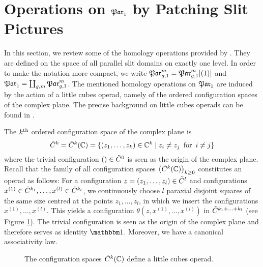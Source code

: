 \section{Operations on \texorpdfstring{$\mathfrak{Par}_1$}{Par1} by Patching Slit Pictures}
\label{homology_operations:parallel_patching_slit_pics}
In this section, we review some of the homology operations provided by \cite{Boedigheimer19902}.
They are defined on the space of all parallel slit domains on exactly one level.
\label{page:shorthand_par_1}%
In order to make the notation more compact, we write $\mathfrak{Par}^m_{g,1} = \mathfrak{Par}^m_{g,1}[(1)]$ and $\mathfrak{Par}_1 = \coprod_{g,m} \mathfrak{Par}^m_{g,1}$.
The mentioned homology operations on $\mathfrak{Par}_1$ are induced by the action of a little cubes operad, namely of the ordered configuration spaces of the complex plane.
The precise background on little cubes operads can be found in \cite{May1972}.

\label{page:configuration_space_cplx_plane}%
The $k^{\text{th}}$ ordered configuration space of the complex plane is
\[
    \cspc k = \cspc k (\C) = \{ ( z_1, \ldots, z_k) \in \C^k \mid z_i \neq z_j \mspc{for}{5} i\neq j\}
\]
where the trivial configuration $() \in {\tilde C^{0}}$ is seen as the origin of the complex plane.
\label{page:operad_theta}%
Recall that the family of all configuration spaces $\big( {\tilde C^{k}}(\mathbb C) \big)_{k \ge 0}$ constitutes an operad as follows:
For a configuration $z = (z_1, \ldots, z_l) \in \cspc l$ and configurations $x^{(1)} \in \cspc{k_1}, \ldots, x^{(l)} \in \cspc{k_l}$,
we continuously choose $l$ paraxial disjoint squares of the same size centred at the points $z_1, \ldots, z_l$,
in which we insert the configurations $x^{(1)}, \ldots, x^{(l)}$.
This yields a configuration $\theta(z, x^{(1)}, \ldots, x^{(l)})$ in $\cspc{k_1 + \ldots + k_l}$ (see Figure \ref{homology_operations:parallel_patching_slit_pics:the_configuration_space_is_an_operad}).
\label{page:operad_unit}%
The trivial configuration is seen as the origin of the complex plane and therefore serves as identity $\Eins$.
Moreover, we have a canonical associativity law.
\begin{figure}[ht]
    \centering
    \def\svgwidth{.8\columnwidth}
    
    \caption{\label{homology_operations:parallel_patching_slit_pics:the_configuration_space_is_an_operad}The configuration spaces ${\tilde C^{k}}(\mathbb C)$ define a little cubes operad.}
\end{figure}


